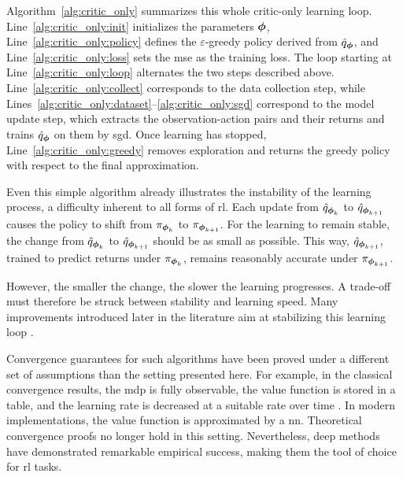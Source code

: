 Algorithm~\ref{alg:critic_only} summarizes this whole critic-only learning loop.
Line~\ref{alg:critic_only:init} initializes the parameters \(\boldsymbol{\phi}\), Line~\ref{alg:critic_only:policy} defines the \(\varepsilon\)-greedy policy derived from \(\hat{q}_{\boldsymbol{\phi}}\), and Line~\ref{alg:critic_only:loss} sets the \gls{mse} as the training loss.
The loop starting at Line~\ref{alg:critic_only:loop} alternates the two steps described above.
Line~\ref{alg:critic_only:collect} corresponds to the data collection step, while Lines~\ref{alg:critic_only:dataset}--\ref{alg:critic_only:sgd} correspond to the model update step, which extracts the observation-action pairs and their returns and trains \(\hat{q}_{\boldsymbol{\phi}}\) on them by \gls{sgd}.
Once learning has stopped, Line~\ref{alg:critic_only:greedy} removes exploration and returns the greedy policy with respect to the final approximation.



Even this simple algorithm already illustrates the instability of the learning process, a difficulty inherent to all forms of \gls{rl}.
Each update from \(\hat{q}_{\boldsymbol{\phi}_k}\) to \(\hat{q}_{\boldsymbol{\phi}_{k+1}}\) causes the policy to shift from \(\pi_{\boldsymbol{\phi}_k}\) to \(\pi_{\boldsymbol{\phi}_{k+1}}\).
For the learning to remain stable, the change from \(\hat{q}_{\boldsymbol{\phi}_k}\) to \(\hat{q}_{\boldsymbol{\phi}_{k+1}}\) should be as small as possible.
This way, \(\hat{q}_{\boldsymbol{\phi}_{k+1}}\), trained to predict returns under \(\pi_{\boldsymbol{\phi}_k}\), remains reasonably accurate under \(\pi_{\boldsymbol{\phi}_{k+1}}\).

However, the smaller the change, the slower the learning progresses.
A trade-off must therefore be struck between stability and learning speed.
Many improvements introduced later in the literature aim at stabilizing this learning loop \parencite{hessel2017rainbowcombiningimprovementsdeep}.

Convergence guarantees for such algorithms have been proved under a different set of assumptions than the setting presented here.
For example, in the classical convergence results, the \gls{mdp} is fully observable, the value function is stored in a table, and the learning rate is decreased at a suitable rate over time \parencite{watkins1992qlearning}.
In modern implementations, the value function is approximated by a \gls{nn}.
Theoretical convergence proofs no longer hold in this setting.
Nevertheless, deep methods have demonstrated remarkable empirical success, making them the tool of choice for \gls{rl} tasks.

